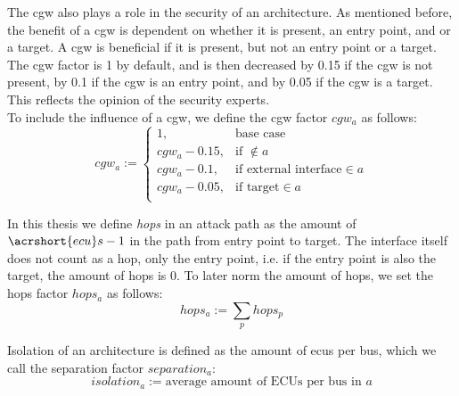 \hfill \break

The \acrshort{cgw} also plays a role in the security of an architecture.
As mentioned before, the benefit of a \acrshort{cgw} is dependent on whether it is present, an entry point, and or a target.
A \acrshort{cgw} is beneficial if it is present, but not an entry point or a target.
The \acrshort{cgw} factor is 1 by default, and is then decreased by 0.15 if the \acrshort{cgw} is not present,
by 0.1 if the \acrshort{cgw} is an entry point, and by 0.05 if the \acrshort{cgw} is a target.
This reflects the opinion of the security experts.\\
To include the influence of a \acrshort{cgw}, we define the \acrshort{cgw} factor $cgw_{a}$ as follows:\\
\begin{equation}
    cgw_{a} := 
    \begin{cases}
    1,&\text{base case}\\
    cgw_{a} - 0.15,&\text{if } \not\in a\\
    cgw_{a} - 0.1,&\text{if external interface} \in a\\
    cgw_{a} - 0.05,&\text{if target} \in a\\
    \end{cases} \label{eq:cgw}
\end{equation}

\hfill \break

In this thesis we define \textit{hops} in an attack path as the amount of \textit{$\acrshort{ecu}s - 1$} in the path from entry point to target.
The interface itself does not count as a hop, only the entry point, i.e. if the entry point is also the target, the amount of hops is 0.
To later norm the amount of hops, we set the hops factor $hops_{a}$ as follows:\\
\begin{equation}
    hops_{a} := \sum_{p} hops_{p} \label{eq:hops}
\end{equation}

\hfill \break

Isolation of an architecture is defined as the amount of \acrshort{ecu}s per bus, which we call the separation factor $separation_{a}$:\\
\begin{equation}
    isolation_{a} := \text{average amount of ECUs per bus in } a \label{eq:isolation}
\end{equation}

\hfill \break

